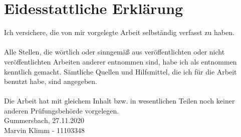 \chapter*{Eidesstattliche Erklärung}

Ich versichere, die von mir vorgelegte Arbeit selbständig verfasst zu haben.\\ \\
Alle Stellen, die wörtlich oder sinngemäß aus veröffentlichten oder nicht veröffentlichten Arbeiten anderer entnommen sind, habe ich als entnommen kenntlich gemacht. Sämtliche Quellen und Hilfsmittel, die ich für die Arbeit benutzt habe, sind angegeben.\\ \\
Die Arbeit hat mit gleichem Inhalt bzw. in wesentlichen Teilen noch keiner anderen Prüfungsbehörde vorgelegen.
\vspace{1.5cm}
\\
Gummersbach, 27.11.2020
\vspace{3cm}
\\
Marvin Klimm - 11103348


